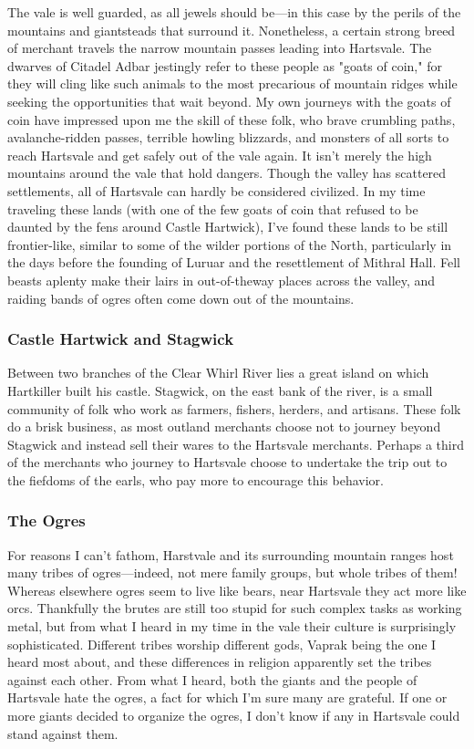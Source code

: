 \documentclass[10pt,a4paper,twoside,twocolumn,openany,bg=print,nodeprecatedcode]{dndbook}
\begin{document}
The vale is well guarded, as all jewels should be—in this case by the perils of the mountains and giantsteads that surround it. Nonetheless, a certain strong breed of merchant travels the narrow mountain passes leading into Hartsvale. The dwarves of Citadel Adbar jestingly refer to these people as "goats of coin," for they will cling like such animals to the most precarious of mountain ridges while seeking the opportunities that wait beyond. My own journeys with the goats of coin have impressed upon me the skill of these folk, who brave crumbling paths, avalanche-ridden passes, terrible howling blizzards, and monsters of all sorts to reach Hartsvale and get safely out of the vale again.
It isn't merely the high mountains around the vale that hold dangers. Though the valley has scattered settlements, all of Hartsvale can hardly be considered civilized. In my time traveling these lands (with one of the few goats of coin that refused to be daunted by the fens around Castle Hartwick), I've found these lands to be still frontier-like, similar to some of the wilder portions of the North, particularly in the days before the founding of Luruar and the resettlement of Mithral Hall. Fell beasts aplenty make their lairs in out-of-theway places across the valley, and raiding bands of ogres often come down out of the mountains.
\subsubsection{Castle Hartwick and Stagwick}
Between two branches of the Clear Whirl River lies a great island on which Hartkiller built his castle. Stagwick, on the east bank of the river, is a small community of folk who work as farmers, fishers, herders, and artisans. These folk do a brisk business, as most outland merchants choose not to journey beyond Stagwick and instead sell their wares to the Hartsvale merchants. Perhaps a third of the merchants who journey to Hartsvale choose to undertake the trip out to the fiefdoms of the earls, who pay more to encourage this behavior.
\subsubsection{The Ogres}
For reasons I can't fathom, Harstvale and its surrounding mountain ranges host many tribes of ogres—indeed, not mere family groups, but whole tribes of them! Whereas elsewhere ogres seem to live like bears, near Hartsvale they act more like orcs. Thankfully the brutes are still too stupid for such complex tasks as working metal, but from what I heard in my time in the vale their culture is surprisingly sophisticated. Different tribes worship different gods, Vaprak being the one I heard most about, and these differences in religion apparently set the tribes against each other. From what I heard, both the giants and the people of Hartsvale hate the ogres, a fact for which I'm sure many are grateful. If one or more giants decided to organize the ogres, I don't know if any in Hartsvale could stand against them.
\end{document}
